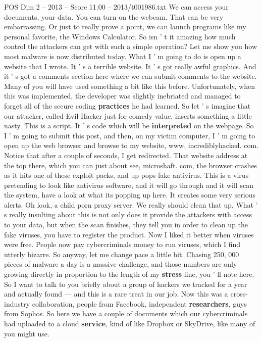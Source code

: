 \begin{textsample}{POS Dim 2 – 2013 – Score 11.00 – 2013/t001986.txt}
We can access your documents, your data.
You can turn on the webcam.
That can be very embarrassing.
Or just to really prove a point, we can launch programs like my personal favorite, the Windows Calculator.
So isn ' t it amazing how much control the attackers can get with such a simple operation?
Let me show you how most malware is now distributed today.
What I ' m going to do is open up a website that I wrote.
It ' s a terrible website.
It ' s got really awful graphics.
And it ' s got a comments section here where we can submit comments to the website.
Many of you will have used something a bit like this before.
Unfortunately, when this was implemented, the developer was slightly inebriated and managed to forget all of the secure coding \textbf{practices} he had learned.
So let ' s imagine that our attacker, called Evil Hacker just for comedy value, inserts something a little nasty.
This is a script.
It ' s code which will be \textbf{interpreted} on the webpage.
So I ' m going to submit this post, and then, on my victim computer, I ' m going to open up the web browser and browse to my website, www. incrediblyhacked. com.
Notice that after a couple of seconds, I get redirected.
That website address at the top there, which you can just about see, microshaft. com, the browser crashes as it hits one of these exploit packs, and up pops fake antivirus.
This is a virus pretending to look like antivirus software, and it will go through and it will scan the system, have a look at what its popping up here.
It creates some very serious alerts.
Oh look, a child porn proxy server.
We really should clean that up.
What ' s really insulting about this is not only does it provide the attackers with access to your data, but when the scan finishes, they tell you in order to clean up the fake viruses, you have to register the product.
Now I liked it better when viruses were free.
People now pay cybercriminals money to run viruses, which I find utterly bizarre.
So anyway, let me change pace a little bit.
Chasing 250, 000 pieces of malware a day is a massive challenge, and those numbers are only growing directly in proportion to the length of my \textbf{stress} line, you ' ll note here.
So I want to talk to you briefly about a group of hackers we tracked for a year and actually found — and this is a rare treat in our job.
Now this was a cross-industry collaboration, people from Facebook, independent \textbf{researchers}, guys from Sophos.
So here we have a couple of documents which our cybercriminals had uploaded to a cloud \textbf{service}, kind of like Dropbox or SkyDrive, like many of you might use.

\end{textsample}
